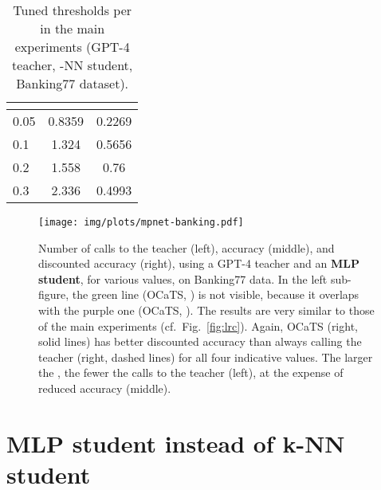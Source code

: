 \documentclass[11pt]{article}
\begin{document}
\begin{table}[!h]
\centering
\small
    \begin{tabular}{|l|c|c|}
    \hline
    \textbf{} & \textbf{} &  \\
    \hline
        0.05 & 0.8359 & 0.2269\\
        0.1 & 1.324 & 0.5656 \\
        0.2 & 1.558 & 0.76 \\
        0.3 & 2.336 & 0.4993 \\
    \hline
    \end{tabular}
    \vspace{-1mm}
\caption{Tuned thresholds per  in the main experiments (GPT-4 teacher, -NN student, Banking77 dataset).}
\label{tab:threshold_pel_l}
\vspace{-1em}
\end{table}


\begin{figure*}[!htbp]

\centering
{
    \texttt{[image: img/plots/mpnet-banking.pdf]}
    \caption{
    Number of calls to the teacher (left),  accuracy (middle), and discounted accuracy (right), using a GPT-4 teacher and an \textbf{MLP student}, for various  values, on Banking77 data. In the left sub-figure, the green line (OCaTS, ) is not visible, because it overlaps with the purple one (OCaTS, ). The results are very similar to those of the main experiments (cf.\ Fig.~\ref{fig:lrc}). Again, OCaTS (right, solid lines) has better discounted accuracy than always calling the teacher (right, dashed lines) for all four indicative  values. The larger the , the fewer the calls to the teacher (left), at the expense of reduced accuracy (middle).}
    \label{fig:mpnet}
    
}
\end{figure*}

\section{MLP student instead of k-NN student} \label{sec:mlp}
\end{document}
